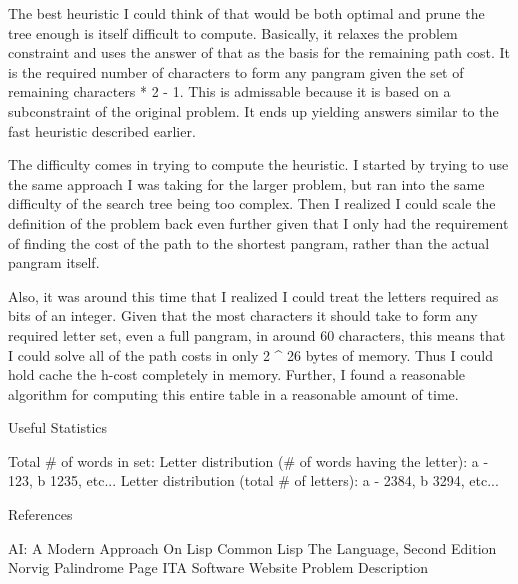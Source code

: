 The best heuristic I could think of that would be both optimal and
prune the tree enough is itself difficult to compute. Basically, it
relaxes the problem constraint and uses the answer of that as the
basis for the remaining path cost. It is the required number of
characters to form any pangram given the set of remaining characters *
2 - 1. This is admissable because it is based on a subconstraint of
the original problem. It ends up yielding answers similar to the fast
heuristic described earlier.

The difficulty comes in trying to compute the heuristic. I started by
trying to use the same approach I was taking for the larger problem,
but ran into the same difficulty of the search tree being too
complex. Then I realized I could scale the definition of the problem
back even further given that I only had the requirement of finding the
cost of the path to the shortest pangram, rather than the actual
pangram itself.

Also, it was around this time that I realized I could treat the
letters required as bits of an integer. Given that the most characters
it should take to form any required letter set, even a full pangram,
in around 60 characters, this means that I could solve all of the path
costs in only 2 ^ 26 bytes of memory. Thus I could hold cache the
h-cost completely in memory. Further, I found a reasonable algorithm
for computing this entire table in a reasonable amount of time.


Useful Statistics

Total # of words in set:
Letter distribution (# of words having the letter): a - 123, b 1235, etc...
Letter distribution (total # of letters): a - 2384, b 3294, etc...



References

AI: A Modern Approach
On Lisp
Common Lisp The Language, Second Edition
Norvig Palindrome Page
ITA Software Website Problem Description

